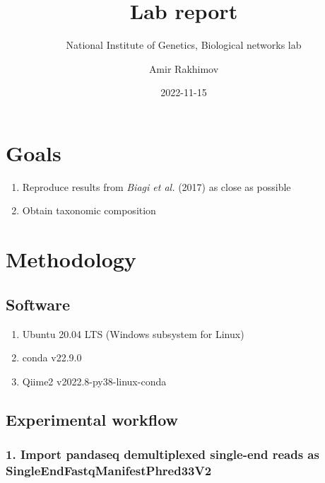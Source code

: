 \documentclass[
]{article}
\title{Lab report}
\subtitle{National Institute of Genetics, Biological networks lab}
\author{Amir Rakhimov}
\date{2022-11-15}
\providecommand{\tightlist}{%
  \setlength{\itemsep}{0pt}\setlength{\parskip}{0pt}}
\begin{document}
\maketitle

\hypertarget{goals}{%
\section{Goals}\label{goals}}

\begin{enumerate}
\def\labelenumi{\arabic{enumi}.}
\tightlist
\item
  Reproduce results from \emph{Biagi et al.} (2017) as close as
  possible\\
\item
  Obtain taxonomic composition
\end{enumerate}

\hypertarget{methodology}{%
\section{Methodology}\label{methodology}}

\hypertarget{software}{%
\subsection{Software}\label{software}}

\begin{enumerate}
\def\labelenumi{\arabic{enumi}.}
\tightlist
\item
  Ubuntu 20.04 LTS (Windows subsystem for Linux)
\item
  conda v22.9.0
\item
  Qiime2 v2022.8-py38-linux-conda
\end{enumerate}

\hypertarget{experimental-workflow}{%
\subsection{Experimental workflow}\label{experimental-workflow}}

\hypertarget{import-pandaseq-demultiplexed-single-end-reads-as-singleendfastqmanifestphred33v2}{%
\subsubsection{\texorpdfstring{1. Import pandaseq demultiplexed
single-end reads as
\textbf{SingleEndFastqManifestPhred33V2}}{1. Import pandaseq demultiplexed single-end reads as SingleEndFastqManifestPhred33V2}}\label{import-pandaseq-demultiplexed-single-end-reads-as-singleendfastqmanifestphred33v2}}
\end{document}

